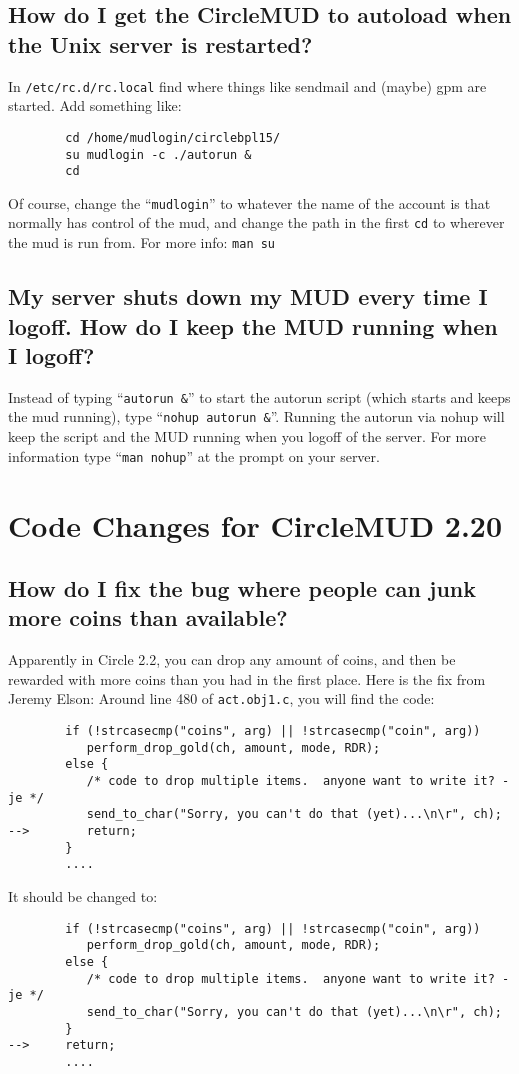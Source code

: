 \documentclass[11pt]{article}
\begin{document}
\subsection{How do I get the CircleMUD to autoload when the Unix server is restarted?}
In \texttt{/etc/rc.d/rc.local} find where things like sendmail and (maybe) gpm are started.  Add something like:
\begin{verbatim}
        cd /home/mudlogin/circlebpl15/
        su mudlogin -c ./autorun &
        cd
\end{verbatim}
Of course, change the ``\texttt{mudlogin}'' to whatever the name of the account is that normally has control of the mud, and change the path in the first \texttt{cd} to wherever the mud is run from.\newline
For more info: \texttt{man su}

\subsection{My server shuts down my MUD every time I logoff. How do I keep the MUD running when I logoff?}
Instead of typing ``\texttt{autorun \&}'' to start the autorun script (which starts and keeps the mud running), type ``\texttt{nohup autorun \&}''. Running the autorun via nohup will keep the script and the MUD running when you logoff of the server. For more information type ``\texttt{man nohup}'' at the prompt on your server.

\section{Code Changes for CircleMUD 2.20}
\subsection{How do I fix the bug where people can junk more coins than available?}
Apparently in Circle 2.2, you can drop any amount of coins, and then be rewarded with more coins than you had in the first place.  Here is the fix from Jeremy Elson:\newline
Around line 480 of \texttt{act.obj1.c}, you will find the code:
\begin{verbatim}
        if (!strcasecmp("coins", arg) || !strcasecmp("coin", arg))
           perform_drop_gold(ch, amount, mode, RDR);
        else {
           /* code to drop multiple items.  anyone want to write it? -je */
           send_to_char("Sorry, you can't do that (yet)...\n\r", ch);
-->        return;
        }
        ....
\end{verbatim}
It should be changed to:
\begin{verbatim}
        if (!strcasecmp("coins", arg) || !strcasecmp("coin", arg))
           perform_drop_gold(ch, amount, mode, RDR);
        else {
           /* code to drop multiple items.  anyone want to write it? -je */
           send_to_char("Sorry, you can't do that (yet)...\n\r", ch);
        }
-->     return;
        ....
\end{verbatim}
\end{document}
